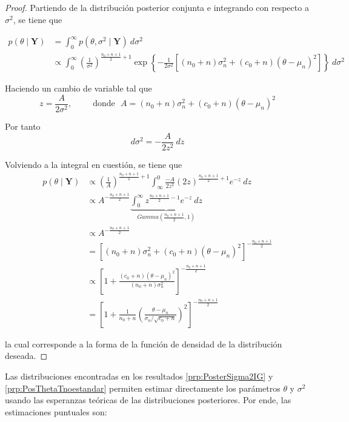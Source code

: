 \documentclass[
  10pt,
  spanish,
]{book}
\theoremstyle{definition}
\theoremstyle{definition}
\theoremstyle{definition}
\theoremstyle{definition}
\theoremstyle{remark}
\begin{document}
\begin{proof}
{}Partiendo de la distribución posterior conjunta e integrando con respecto a \(\sigma^2\), se tiene que

\begin{align*}
p(\theta \mid \mathbf{Y})&= \int_0^{\infty} p(\theta,\sigma^2 \mid \mathbf{Y}) \ d\sigma^2 \\
&\propto \int_0^{\infty} \left(\frac{1}{\sigma^2}\right)^{\frac{n_0+n+1}{2}+1}
\exp\left\{-\frac{1}{2\sigma^2}\left[(n_0+n)\sigma^2_n+(c_0+n)(\theta-\mu_n)^2\right]\right\} \ d\sigma^2
\end{align*}

Haciendo un cambio de variable tal que
\begin{equation*}
z=\frac{A}{2\sigma^2}, \ \ \ \ \ \ \ \ \ \ \ \text{donde} \ \ \ A=(n_0+n)\sigma^2_n+(c_0+n)(\theta-\mu_n)^2
\end{equation*}

Por tanto
\begin{equation*}
d\sigma^2=-\frac{A}{2z^2} \ dz
\end{equation*}

Volviendo a la integral en cuestión, se tiene que
\begin{align*}
p(\theta \mid \mathbf{Y})& \propto
\left(\frac{1}{A}\right)^{\frac{n_0+n+1}{2}+1}\int_{\infty}^{0} \frac{-A}{2z^2} (2z)^{\frac{n_0+n+1}{2}+1}e^{-z} \ dz \\
&\propto A^{-\frac{n_0+n+1}{2}}\underbrace{\int_{0}^{\infty} z^{\frac{n_0+n+1}{2}-1}e^{-z}\ dz}_{Gamma\left(\frac{n_0+n+1}{2},1\right)}\\
&\propto A^{-\frac{n_0+n+1}{2}}\\
&= \left[(n_0+n)\sigma^2_n+(c_0+n)(\theta-\mu_n)^2\right]^{-\frac{n_0+n+1}{2}}\\
&\propto \left[1+\frac{(c_0+n)(\theta-\mu_n)^2}{(n_0+n)\sigma^2_n}\right]^{-\frac{n_0+n+1}{2}}\\
&=\left[1+\frac{1}{n_0+n}\left(\frac{\theta-\mu_n}{\sigma_n/\sqrt{c_0+n}}\right)^2\right]^{-\frac{n_0+n+1}{2}}
\end{align*}

la cual corresponde a la forma de la función de densidad de la distribución deseada.
\end{proof}

Las distribuciones encontradas en los resultados \ref{prp:PosterSigma2IG} y \ref{prp:PosThetaTnoestandar} permiten estimar directamente los parámetros \(\theta\) y \(\sigma^2\) usando las esperanzas teóricas de las distribuciones posteriores. Por ende, las estimaciones puntuales son:
\end{document}
